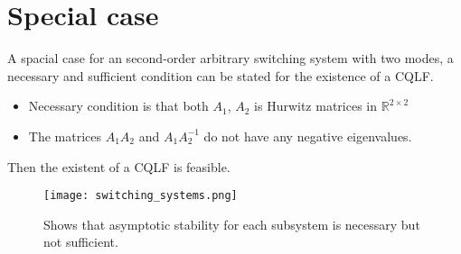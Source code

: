 \section{Special case}
A spacial case for an second-order arbitrary switching system with two modes, a necessary and sufficient condition can be stated for the existence of a CQLF.
\begin{itemize}
        \item Necessary condition is that both $A_1$, $A_2$ is Hurwitz matrices in $\mathbb{R}^{2\times2}$
        \item The matrices $A_1A_2$ and $A_1A_2^{-1}$ do not have any negative eigenvalues.
\end{itemize}
Then the existent of a CQLF is feasible.
\begin{figure}[htbp]
        \centering
        \texttt{[image: switching\_systems.png]}
        \caption{Shows that asymptotic stability for each subsystem is necessary but not sufficient.}
        \label{fig:switching_systems}
\end{figure}